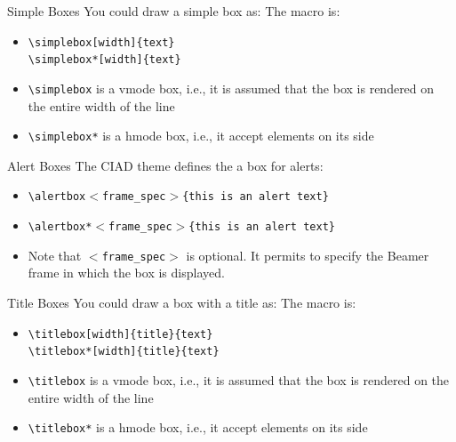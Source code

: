 \documentclass[english,sectioncirclenumberstyle]{ciadbeamer}
\begin{document}
\begin{frame}{Simple Boxes}
	You could draw a simple box as:
	The macro is:	
	\begin{itemize}
	\item \texttt{{\textbackslash}simplebox[width]\{text\}} \\
		\texttt{{\textbackslash}simplebox*[width]\{text\}} \\[.5cm]
	\item \texttt{{\textbackslash}simplebox} is a vmode box, i.e., it is assumed that the box is rendered on the entire width of the line
	\item \texttt{{\textbackslash}simplebox*} is a hmode box, i.e., it accept elements on its side
	\end{itemize}
\end{frame}

\begin{frame}{Alert Boxes}
	The CIAD theme defines the a box for alerts: \\
	\begin{itemize}
	\item \texttt{{\textbackslash}alertbox\ensuremath{<}frame\_spec\ensuremath{>}\{this is an alert text\}} \\[.5cm]
		\vspace{1cm}
	\item \texttt{{\textbackslash}alertbox*\ensuremath{<}frame\_spec\ensuremath{>}\{this is an alert text\}} \\[.5cm]
	\item Note that \texttt{\ensuremath{<}frame\_spec\ensuremath{>}} is optional. It permits to specify the Beamer frame in which the box is displayed.
	\end{itemize}
\end{frame}

\begin{frame}{Title Boxes}
	You could draw a box with a title as:
	The macro is:	
	\begin{itemize}
	\item \texttt{{\textbackslash}titlebox[width]\{title\}\{text\}} \\
		\texttt{{\textbackslash}titlebox*[width]\{title\}\{text\}} \\[.5cm]
	\item \texttt{{\textbackslash}titlebox} is a vmode box, i.e., it is assumed that the box is rendered on the entire width of the line
	\item \texttt{{\textbackslash}titlebox*} is a hmode box, i.e., it accept elements on its side
	\end{itemize}
\end{frame}
\end{document}
